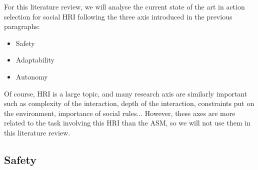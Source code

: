 



For this literature review, we will analyse the current state of the art in action selection for social HRI following the three axis introduced in the previous paragraphs:
\begin{itemize}
\item Safety
\item Adaptability
\item Autonomy
\end{itemize}

Of course, HRI is a large topic, and many research axis are similarly important such as complexity of the interaction, depth of the interaction, constraints put on the environment, importance of social rules... However, these axes are more related to the task involving this HRI than the ASM, so we will not use them in this literature review.


	\subsection{Safety} 
	
